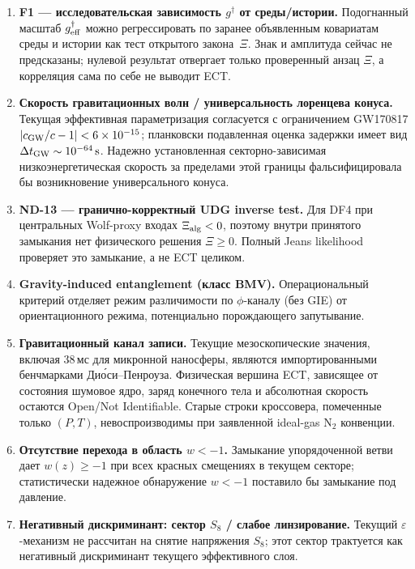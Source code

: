 \documentclass[11pt,a4paper]{article}
\begin{document}
\begin{enumerate}[leftmargin=1.4em,itemsep=2pt]
\item \textbf{F1 — исследовательская зависимость $g^\dagger$ от среды/истории.}
      Подогнанный масштаб $g^\dagger_{\rm eff}$ можно регрессировать
      по заранее объявленным ковариатам среды и истории как тест
      открытого закона~$\Xi$. Знак и амплитуда сейчас не предсказаны;
      нулевой результат отвергает только проверенный анзац $\Xi$,
      а корреляция сама по себе не выводит ECT.
\item \textbf{Скорость гравитационных волн / универсальность
      лоренцева конуса.}
      Текущая эффективная параметризация согласуется с
      ограничением GW170817
      $|c_{\rm GW}/c-1|<6\times10^{-15}$;
      планковски подавленная оценка задержки имеет вид
      $\Delta t_{\rm GW}\sim 10^{-64}\,\mathrm{s}$.
      Надежно установленная секторно-зависимая низкоэнергетическая
      скорость за пределами этой границы фальсифицировала бы
      возникновение универсального конуса.
\item \textbf{ND-13 — гранично-корректный UDG inverse test.}
      Для DF4 при центральных Wolf-proxy входах $\Xi_{\rm alg}<0$, поэтому
      внутри принятого замыкания нет физического решения $\Xi\ge0$. Полный
      Jeans likelihood проверяет это замыкание, а не ECT целиком.
\item \textbf{Gravity-induced entanglement (класс BMV).}
      Операциональный критерий отделяет режим различимости по
      $\phi$-каналу (без GIE) от ориентационного режима,
      потенциально порождающего запутывание.
\item \textbf{Гравитационный канал записи.}
      Текущие мезоскопические значения, включая $38$\,мс для
      микронной наносферы, являются импортированными бенчмарками
      Ди\'оси--Пенроуза.  Физическая вершина ECT, зависящее от
      состояния шумовое ядро, заряд конечного тела и абсолютная
      скорость остаются Open/Not Identifiable.  Старые строки
      кроссовера, помеченные только $(P,T)$, невоспроизводимы при
      заявленной ideal-gas N$_2$ конвенции.
\item \textbf{Отсутствие перехода в область $w<-1$.}
      Замыкание упорядоченной ветви дает $w(z)\ge -1$ при всех
      красных смещениях в текущем секторе; статистически надежное
      обнаружение $w<-1$ поставило бы замыкание под давление.
\item \textbf{Негативный дискриминант: сектор $S_8$ / слабое
      линзирование.}
      Текущий $\varepsilon$-механизм не рассчитан на снятие
      напряжения $S_8$; этот сектор трактуется как негативный
      дискриминант текущего эффективного слоя.
\end{enumerate}
\end{document}
